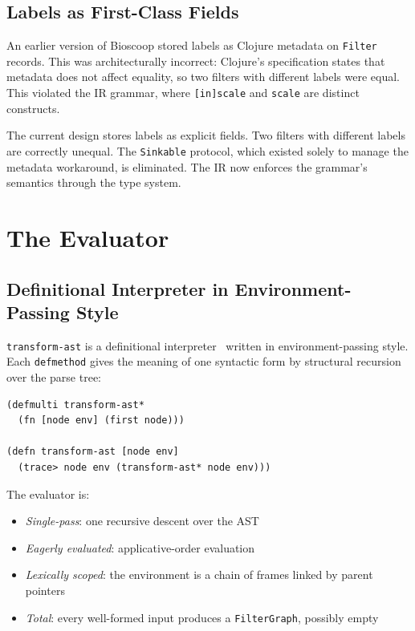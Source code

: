 \documentclass[conference]{IEEEtran}
\begin{document}
\subsection{Labels as First-Class Fields}

An earlier version of Bioscoop stored labels as Clojure metadata on \texttt{Filter} records. This was architecturally incorrect: Clojure's specification states that metadata does not affect equality, so two filters with different labels were equal. This violated the IR grammar, where \texttt{[in]scale} and \texttt{scale} are distinct constructs.

The current design stores labels as explicit fields. Two filters with different labels are correctly unequal. The \texttt{Sinkable} protocol, which existed solely to manage the metadata workaround, is eliminated. The IR now enforces the grammar's semantics through the type system.

\section{The Evaluator}

\subsection{Definitional Interpreter in Environment-Passing Style}

\texttt{transform-ast} is a definitional interpreter~\cite{reynolds} written in environment-passing style. Each \texttt{defmethod} gives the meaning of one syntactic form by structural recursion over the parse tree:

\begin{lstlisting}[caption={The evaluator entry point}]
(defmulti transform-ast*
  (fn [node env] (first node)))

(defn transform-ast [node env]
  (trace> node env (transform-ast* node env)))
\end{lstlisting}

The evaluator is:

\begin{itemize}
\item \emph{Single-pass}: one recursive descent over the AST
\item \emph{Eagerly evaluated}: applicative-order evaluation
\item \emph{Lexically scoped}: the environment is a chain of frames linked by parent pointers
\item \emph{Total}: every well-formed input produces a \texttt{FilterGraph}, possibly empty
\end{itemize}
\end{document}

